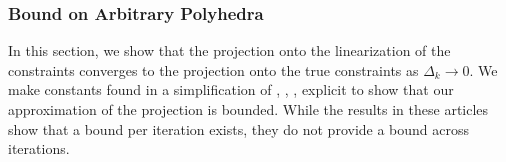 \documentclass{article}
\newtheorem{theorem}{Theorem}[section]
\theoremstyle{case}
\numberwithin{theorem}{subsection}
\newcommand{\dk}{\Delta_k}
\newcommand{\xk}{x^{(k)}}
\newcommand{\xl}{{x^{(l)}}}
\newcommand{\projkl}{{p^{(k,l)}}}
\newcommand{\projkk}{{p^{(k,k)}}}
\newcommand{\activeprojkk}{{\mathbb P^{(k, k)}}}
\newcommand{\activeprojkl}{{\mathbb P^{(k, l)}}}
\begin{document}

\subsubsection{Bound on Arbitrary Polyhedra}

In this section, we show that the projection onto the linearization of the constraints converges to the projection onto the true constraints as $\dk \to 0$.
We make constants found in a simplification of 
\cite{pena2020new},
\cite{hoffman_theorem},
\cite{continuity_of_metric_projections},
\cite{perturbations_of_linear_inequalities} 
explicit to show that our approximation of the projection is bounded.
While the results in these articles show that a bound per iteration exists, they do not provide a bound across iterations.
\end{document}
